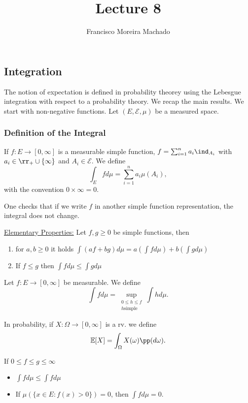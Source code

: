 \documentclass[../main.tex]{subfiles}
\author{Francisco Moreira Machado}
\title{Lecture 8}
\begin{document}
\subsection{Integration}
The notion of expectation is defined in probability theorey using the Lebesgue integration with
respect to a probability theory. We recap the main results.
\vspace{0.3em}
We start with non-negative functions. Let $(E, \mathcal{E}, \mu)$ be a
measured space.
\subsubsection{Definition of the Integral}
\begin{definition}
  If $f \colon E \to [0, \infty]$ is a measurable simple function, $f
  = \sum_{i=1}^n a_i \ind_{A_i}$ with $a_i \in \rr_+ \cup \{ \infty \}
  $ and $A_i \in \mathcal{E}$. We define 
  \[
    \int_{E} f d\mu = \sum_{i=1}^n a_i \mu(A_i)
  ,\] 
  with the convention $0 \times \infty = 0$.
\end{definition}

One checks that if we write $f$ in another simple function
representation, the integral does not change.

\underline{\sffamily Elementary Properties:} Let $f, g \geq 0$ be
simple functions, then
\begin{enumerate}
  \item for $a, b \geq 0$ it holds $\int (af + bg)d\mu = a(\int fd\mu) +
    b (\int gd\mu)$
  \item If $f \leq g$ then $\int f d\mu \leq \int g d\mu $
\end{enumerate}

\begin{definition}
  Let $f \colon E \to [0, \infty]$ be measurable. We define
  \[
    \int f d\mu = \sup_{\substack{0 \leq h \leq f \\ h \text{
      simple}}} \int h d\mu
  .\] 
\end{definition}

\begin{definition}
  [Expectation]
  In probability, if $X \colon \Omega \to [0, \infty]$ is a rv. we
  define
  \[
    \mathbb{E}[X] = \int_{\Omega} X(\omega) \pp(d\omega)
  .\] 
\end{definition}

\begin{proposition}
    If $0 \leq f \leq g \leq \infty $
    \begin{itemize}
      \item $\int f d\mu \leq \int f d\mu$
      \item If $\mu(\{ x \in E \colon f(x) > 0 \} ) = 0$, then $\int f
        d\mu = 0$.
    \end{itemize}
\end{proposition}
\end{document}

